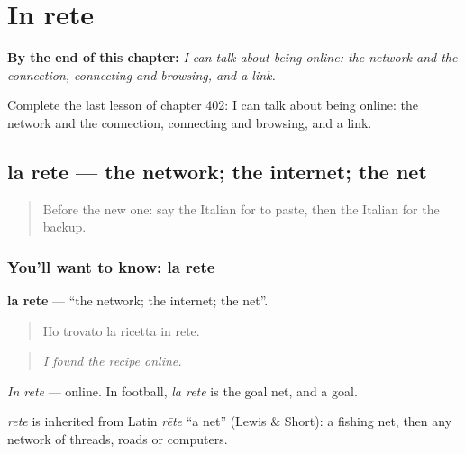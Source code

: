 
\chapter{In rete}
\label{ch:it-in-rete}

\begin{chapteropening}
\textbf{By the end of this chapter:} \emph{I can talk about being online: the network and the connection, connecting and browsing, and a link.}

Complete the last lesson of chapter 402: I can talk about being online: the network and the connection, connecting and browsing, and a link.
\end{chapteropening}

\section[la rete]{la rete — the network; the internet; the net}

\label{lesson:IT-C402-rete}



\begin{quote}
Before the new one: say the Italian for to paste, then the Italian for the backup.
\end{quote}

\subsection*{You'll want to know: la rete}
\textbf{la rete} — \textquotedblleft{}the network; the internet; the net\textquotedblright{}.

\begin{quote}
Ho trovato la ricetta in rete.
\end{quote}

\begin{quote}
\emph{I found the recipe online.}
\end{quote}

\emph{In rete} — online. In football, \emph{la rete} is the goal net, and a goal.

\begin{cousinweb}
\emph{rete} is inherited from Latin \emph{rēte} \textquotedblleft{}a net\textquotedblright{} (Lewis \& Short): a fishing net, then any network of threads, roads or computers.
\end{cousinweb}

